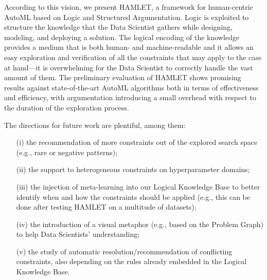 According to this vision, we present HAMLET, a framework for human-centric AutoML based on Logic and Structured Argumentation.
Logic is exploited to structure the knowledge that the Data Scientist gathers while designing, modeling, and deploying a solution.
The logical encoding of the knowledge provides a medium that is both human- and machine-readable and it allows an easy exploration and verification of all the constraints that may apply to the case at hand---it is overwhelming for the Data Scientist to correctly handle the vast amount of them.
The preliminary evaluation of HAMLET shows promising results against state-of-the-art AutoML algorithms both in terms of effectiveness and efficiency, with argumentation introducing a small overhead with respect to the duration of the exploration process.

The directions for future work are plentiful, among them:
\begin{itemize}
    \item[(i)] the recommendation of more constraints out of the explored search space (e.g., rare or negative patterns);
    \item[(ii)] the support to heterogeneous constraints on hyperparameter domains;
    \item[(iii)] the injection of meta-learning into our Logical Knowledge Base to better identify when and how the constraints should be applied (e.g., this can be done after testing HAMLET on a multitude of datasets);
    \item[(iv)] the introduction of a visual metaphor (e.g., based on the Problem Graph) to help Data Scientists' understanding;
    \item[(v)] the study of automatic resolution/recommendation of conflicting constraints, also depending on the rules already embedded in the Logical Knowledge Base.
\end{itemize}
